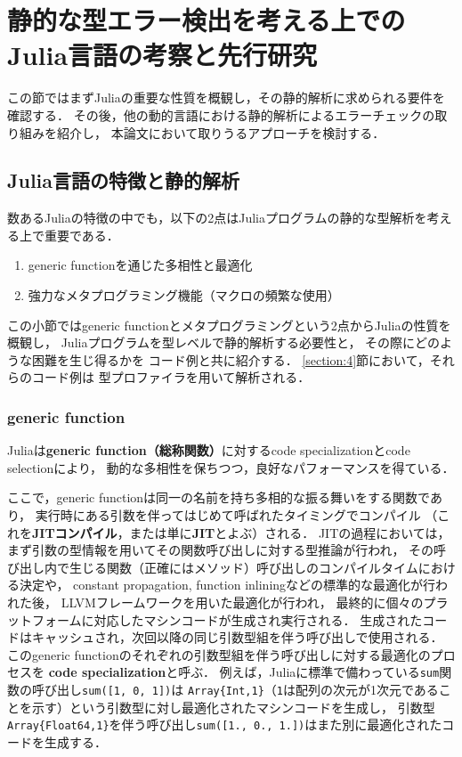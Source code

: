 
\section{静的な型エラー検出を考える上でのJulia言語の考察と先行研究} \label{section:2}

この節ではまずJuliaの重要な性質を概観し，その静的解析に求められる要件を確認する．
その後，他の動的言語における静的解析によるエラーチェックの取り組みを紹介し，
本論文において取りうるアプローチを検討する．


\subsection{Julia言語の特徴と静的解析} \label{subsection:2-1}

数あるJuliaの特徴の中でも，以下の2点はJuliaプログラムの静的な型解析を考える上で重要である．

\begin{enumerate}
  \item generic functionを通じた多相性と最適化
  \item 強力なメタプログラミング機能（マクロの頻繁な使用）
\end{enumerate}

この小節ではgeneric functionとメタプログラミングという2点からJuliaの性質を概観し，
Juliaプログラムを型レベルで静的解析する必要性と，
その際にどのような困難を生じ得るかを
コード例と共に紹介する．
\ref{section:4}節において，それらのコード例は
型プロファイラを用いて解析される．

\subsubsection{generic function} \label{subsubsection:generic-function}

Juliaは\textbf{generic function（総称関数）}に対するcode specializationとcode selectionにより，
動的な多相性を保ちつつ，良好なパフォーマンスを得ている\cite{jeff-phd}．

ここで，generic functionは同一の名前を持ち多相的な振る舞いをする関数であり，
実行時にある引数を伴ってはじめて呼ばれたタイミングでコンパイル
（これを\textbf{JITコンパイル}，または単に\textbf{JIT}とよぶ）される．
JITの過程においては，まず引数の型情報を用いてその関数呼び出しに対する型推論が行われ，
その呼び出し内で生じる関数（正確にはメソッド）呼び出しのコンパイルタイムにおける決定や，
constant propagation, function inliningなどの標準的な最適化が行われた後，
LLVMフレームワーク\cite{LLVM}を用いた最適化が行われ，
最終的に個々のプラットフォームに対応したマシンコードが生成され実行される．
生成されたコードはキャッシュされ，次回以降の同じ引数型組を伴う呼び出しで使用される．
このgeneric functionのそれぞれの引数型組を伴う呼び出しに対する最適化のプロセスを
\textbf{code specialization}と呼ぶ．
例えば，Juliaに標準で備わっている\verb|sum|関数の呼び出し\verb|sum([1, 0, 1])|は
\verb|Array{Int,1}|（\verb|1|は配列の次元が1次元であることを示す）という引数型に対し最適化されたマシンコードを生成し，
引数型\verb|Array{Float64,1}|を伴う呼び出し\verb|sum([1., 0., 1.])|はまた別に最適化されたコードを生成する．

